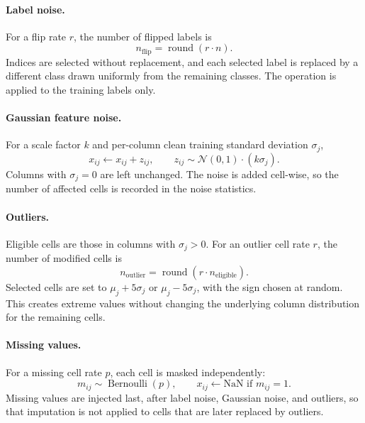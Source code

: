 \paragraph{Label noise.} For a flip rate $r$, the number of flipped labels is
\begin{equation}
n_{\text{flip}} = \operatorname{round}(r \cdot n).
\end{equation}
Indices are selected without replacement, and each selected label is replaced by a different class drawn uniformly from the remaining classes. The operation is applied to the training labels only.

\paragraph{Gaussian feature noise.} For a scale factor $k$ and per-column clean training standard deviation $\sigma_j$,
\begin{equation}
x_{ij} \leftarrow x_{ij} + z_{ij}, \qquad z_{ij} \sim \mathcal{N}(0,1)\cdot (k\sigma_j).
\end{equation}
Columns with $\sigma_j = 0$ are left unchanged. The noise is added cell-wise, so the number of affected cells is recorded in the noise statistics.

\paragraph{Outliers.} Eligible cells are those in columns with $\sigma_j > 0$. For an outlier cell rate $r$, the number of modified cells is
\begin{equation}
n_{\text{outlier}} = \operatorname{round}(r \cdot n_{\text{eligible}}).
\end{equation}
Selected cells are set to $\mu_j + 5\sigma_j$ or $\mu_j - 5\sigma_j$, with the sign chosen at random. This creates extreme values without changing the underlying column distribution for the remaining cells.

\paragraph{Missing values.} For a missing cell rate $p$, each cell is masked independently:
\begin{equation}
m_{ij} \sim \operatorname{Bernoulli}(p), \qquad x_{ij} \leftarrow \text{NaN if } m_{ij}=1.
\end{equation}
Missing values are injected last, after label noise, Gaussian noise, and outliers, so that imputation is not applied to cells that are later replaced by outliers.

